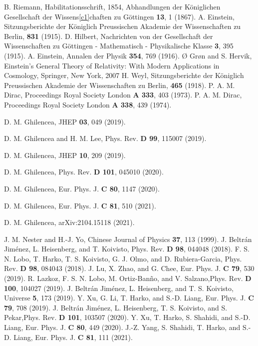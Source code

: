 \documentclass[aps,superscriptaddress, showpacs,preprintnumbers, superscriptaddress, nofootinbibt,twocolumn]{revtex4-2}
\begin{document}
\begin{thebibliography}{99}

 B. Riemann, Habilitationsschrift, 1854, Abhandlungen der K\"{o}niglichen Gesellschaft der Wissens\ref{c1}chaften zu
G\"{o}ttingen {\bf 13}, 1 (1867).
 A. Einstein, Sitzungsberichte der K\"{o}niglich Preussischen Akademie der Wissenschaften zu Berlin, {\bf 831}
(1915).
 D. Hilbert, Nachrichten von der Gesellschaft der Wissenschaften zu G\"{o}ttingen - Mathematisch - Physikalische Klasse {\bf 3}, 395 (1915).
 A. Einstein, Annalen der Physik {\bf 354}, 769 (1916).
 {\O} Gr{\o}n and S. Hervik, Einstein's General Theory of Relativity:
With Modern Applications in Cosmology, Springer, New York,  2007
 H. Weyl, Sitzungsberichte der K\"{o}niglich Preussischen
Akademie der Wissenschaften zu Berlin, {\bf 465} (1918).
 P. A. M. Dirac, Proceedings Royal Society London {\bf A 333}, 403 (1973).
 P. A. M. Dirac, Proceedings Royal Society London {\bf A 338}, 439 (1974).

 D. M. Ghilencea, JHEP {\bf 03},  049 (2019).

 D. M. Ghilencea and H. M. Lee, Phys. Rev. {\bf D 99}, 115007 (2019).

 D. M. Ghilencea, JHEP {\bf 10}, 209 (2019).

 D. M. Ghilencea, Phys. Rev. {\bf D 101}, 045010 (2020).

 D. M. Ghilencea, Eur. Phys. J. {\bf C 80}, 1147 (2020).

 D. M. Ghilencea, Eur. Phys. J. {\bf C 81}, 510 (2021).

 D. M. Ghilencea, arXiv:2104.15118 (2021).

 J. M. Nester and H.-J. Yo, Chinese Journal of Physics {\bf 37}, 113 (1999).
 J. Beltr\'{a}n Jim\'{e}nez, L. Heisenberg, and T. Koivisto,
Phys. Rev. {\bf D 98}, 044048 (2018).
 F. S. N. Lobo, T. Harko, T. S. Koivisto, G. J. Olmo, and
D. Rubiera-Garcia, Phys. Rev. {\bf D 98}, 084043 (2018).
 J. Lu, X. Zhao, and G. Chee, Eur. Phys. J. {\bf C 79}, 530
(2019).
 R. Lazkoz, F. S. N. Lobo, M. Ortiz-Ban\~{n}o, and V.
Salzano,Phys. Rev. {\bf D 100}, 104027 (2019).
 J. Beltr\'{a}n Jim\'{e}nez, L. Heisenberg, and T. S. Koivisto,
Universe {\bf 5}, 173 (2019).
 Y. Xu, G. Li, T. Harko, and S.-D. Liang, Eur. Phys. J.
{\bf C 79}, 708 (2019).
 J. Beltr\'{a}n Jim\'{e}nez, L. Heisenberg, T. S. Koivisto, and
S. Pekar,Phys. Rev. {\bf D 101}, 103507 (2020).
 Y. Xu, T. Harko, S. Shahidi, and S.-D. Liang, Eur. Phys. J. {\bf C 80}, 449 (2020).
 J.-Z. Yang, S. Shahidi, T. Harko, and S.-D. Liang, Eur. Phys. J. {\bf C  81}, 111 (2021).


\end{thebibliography}
\end{document}
